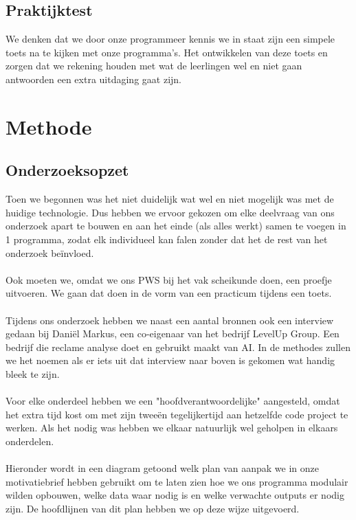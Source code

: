 \documentclass[12pt]{article}
\begin{document}
\begin{multicols}{2}
\subsection{Praktijktest}
We denken dat we door onze programmeer kennis we in staat zijn een simpele toets na te kijken met onze programma's. Het ontwikkelen van deze toets en zorgen dat we rekening houden met wat de leerlingen wel en niet gaan antwoorden een extra uitdaging gaat zijn.
\end{multicols}
\pagebreak

\section{Methode}
\subsection{Onderzoeksopzet}
\begin{multicols}{2}
Toen we begonnen was het niet duidelijk wat wel en niet mogelijk was met de huidige technologie. Dus hebben we ervoor gekozen om elke deelvraag van ons onderzoek apart te bouwen en aan het einde (als alles werkt) samen te voegen in 1 programma, zodat elk individueel kan falen zonder dat het de rest van het onderzoek beïnvloed.
\\\\
Ook moeten we, omdat we ons PWS bij het vak scheikunde doen, een proefje uitvoeren. We gaan dat doen in de vorm van een practicum tijdens een toets.
\\\\
Tijdens ons onderzoek hebben we naast een aantal bronnen ook een interview gedaan bij Daniël Markus, een co-eigenaar van het bedrijf LevelUp Group. Een bedrijf die reclame analyse doet en gebruikt maakt van AI. In de methodes zullen we het noemen als er iets uit dat interview naar boven is gekomen wat handig bleek te zijn.
\\\\
Voor elke onderdeel hebben we een "hoofdverantwoordelijke" aangesteld, omdat het extra tijd kost om met zijn tweeën tegelijkertijd aan hetzelfde code project te werken. Als het nodig was hebben we elkaar natuurlijk wel geholpen in elkaars onderdelen. 
\\\\
Hieronder wordt in een diagram getoond welk plan van aanpak we in onze motivatiebrief hebben gebruikt om te laten zien hoe we ons programma modulair wilden opbouwen, welke data waar nodig is en welke verwachte outputs er nodig zijn. De hoofdlijnen van dit plan hebben we op deze wijze uitgevoerd.
\end{multicols}
\end{document}
